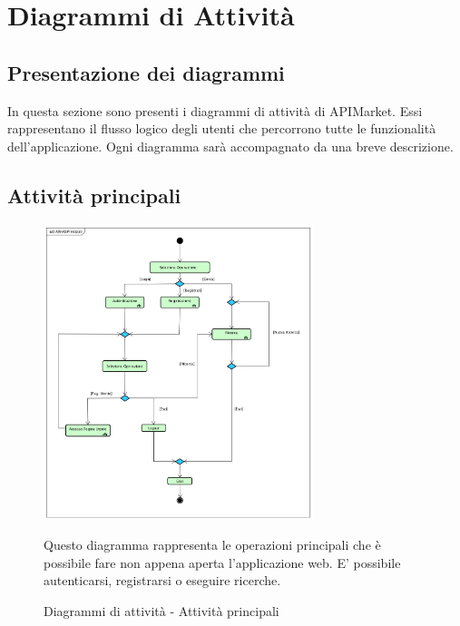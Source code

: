 \section{Diagrammi di Attività}{
	\subsection{Presentazione dei diagrammi}{
		In questa sezione sono presenti i diagrammi di attività di APIMarket. Essi rappresentano il flusso logico degli utenti che percorrono tutte le funzionalità dell'applicazione. Ogni diagramma sarà accompagnato da una breve descrizione.
	}
	\subsection{Attività principali}{
		\begin{figure}[ht]
			\centering
			\includegraphics[width=0.7\textwidth]{img/attivitaPrincipali}
			\caption{Diagrammi di attività - Attività principali}
			Questo diagramma rappresenta le operazioni principali che è possibile fare non appena aperta l'applicazione web. E' possibile autenticarsi, registrarsi o eseguire ricerche. 
		\end{figure}	
	}
}
